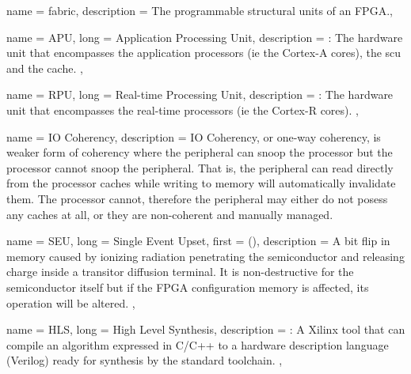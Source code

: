 {
	name = {fabric},
	description = {The programmable structural units of an FPGA.},
}

{
	name = {APU},
	long = {Application Processing Unit},
	description = {\emph{}:
		The hardware unit that encompasses the application processors (ie the Cortex-A cores),
		the \gls{scu} and the cache.
	},
}

{
	name = {RPU},
	long = {Real-time Processing Unit},
	description = {\emph{}:
		The hardware unit that encompasses the real-time processors (ie the Cortex-R cores).
	},
}


{
	name = {IO Coherency},
	description = {
		IO Coherency, or one-way coherency, is weaker form of coherency where
		the peripheral can snoop the processor but the processor cannot snoop the peripheral.
		That is, the peripheral can read directly from the processor caches while
		writing to memory will automatically invalidate them. The processor cannot,
		therefore the peripheral may either do not posess any caches at all, or they
		are non-coherent and manually managed.
	}
}


{
	name = {SEU},
	long = {Single Event Upset},
	first = { ()},
	description = {
		A bit flip in memory caused by ionizing radiation penetrating the semiconductor 
		and releasing charge inside a transitor diffusion terminal. It is non-destructive
		for the semiconductor itself but if the FPGA configuration memory is affected,
		its operation will be altered.
	},
}

{
	name = {HLS},
	long = {High Level Synthesis},
	description = {\emph{}:
		A Xilinx tool that can compile an algorithm expressed in C/C++ to 
		a hardware description language (Verilog) ready for synthesis by
		the standard toolchain.
	},
}

